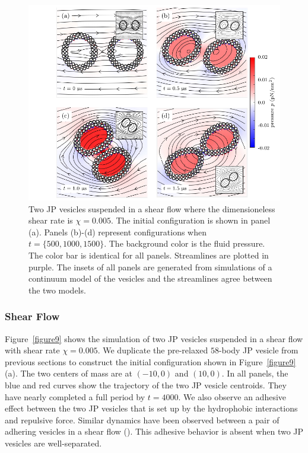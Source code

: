 \documentclass[lineno]{jfm}
\begin{document}
\begin{figure}
  \centering
\includegraphics[width=\textwidth]{Figure10_Wrapper.pdf}  
  \caption{\label{figure10} Two JP vesicles suspended in a shear flow
  where the dimensioneless shear rate is $\chi=0.005$. The initial
  configuration is shown in panel (a). Panels (b)-(d) represent configurations when $t = \{500, 1000, 1500\}$.
  The background color is the fluid
  pressure. The color bar is identical for all panels. Streamlines are
  plotted in purple. The insets of all panels are generated from
  simulations of a continuum model of the vesicles and the streamlines
  agree between the two models. }
\end{figure}

\subsubsection{Shear Flow}

Figure~\ref{figure9} shows the simulation of two JP vesicles suspended
in a shear flow with shear rate $\chi=0.005$. We duplicate the
pre-relaxed $58$-body JP vesicle from previous sections to construct the
initial configuration shown in Figure~\ref{figure9}(a). The two centers
of mass are at $(-10,0)$ and $(10,0)$. In all panels, the blue and red
curves show the trajectory of the two JP vesicle centroids. They have
nearly completed a full period by $t=4000$. We also observe an adhesive
effect between the two JP vesicles that is set up by the hydrophobic
interactions and repulsive force. Similar dynamics have been observed
between a pair of adhering vesicles in a shear flow
(\cite{qua-vee-you2019, abb-far-ezz-ben-mis2021}). This adhesive
behavior is absent when two JP vesicles are well-separated.
\end{document}
